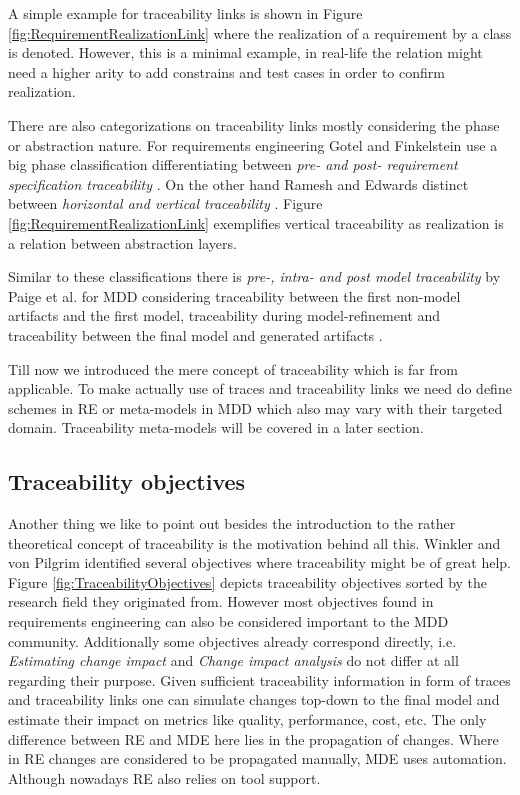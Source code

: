 

A simple example for traceability links is shown in Figure \ref{fig:RequirementRealizationLink} where the realization of a requirement by a class is denoted. 
However, this is a minimal example, in real-life the relation might need a higher arity to add constrains and test cases in order to confirm realization.

There are also categorizations on traceability links mostly considering the phase or abstraction nature.
For requirements engineering Gotel and Finkelstein use a big phase classification differentiating between \textit{pre- and post- requirement specification traceability} \cite{GotelFinkelstein}.
On the other hand Ramesh and Edwards distinct between \textit{horizontal and vertical traceability} \cite{RameshEdwards}.
Figure \ref{fig:RequirementRealizationLink} exemplifies vertical traceability as realization is a relation between abstraction layers.

Similar to these classifications there is \textit{pre-, intra- and post model traceability} by Paige et al. for MDD considering traceability between the first non-model artifacts and the first model, traceability during model-refinement and traceability between the final model and generated artifacts \cite{TraceabilitySurvey}.

Till now we introduced the mere concept of traceability which is far from applicable.
To make actually use of traces and traceability links we need do define schemes in RE or meta-models in MDD which also may vary with their targeted domain.
Traceability meta-models will be covered in a later section.


\subsection{Traceability objectives}
Another thing we like to point out besides the introduction to the rather theoretical concept of traceability is the motivation behind all this. 
Winkler and von Pilgrim \cite{TraceabilitySurvey} identified several objectives where traceability might be of great help. 
Figure \ref{fig:TraceabilityObjectives} depicts traceability objectives sorted by the research field they originated from. 
However most objectives found in requirements engineering can also be considered important to the MDD community. 
Additionally some objectives already correspond directly, i.e. \textit{Estimating change impact} and \textit{Change impact analysis} do not differ at all regarding their purpose. 
Given sufficient traceability information in form of traces and traceability links one can simulate changes top-down to the final model and estimate their impact on metrics like quality, performance, cost, etc. 
The only difference between RE and MDE here lies in the propagation of changes. 
Where in RE changes are considered to be propagated manually, MDE uses automation. 
Although nowadays RE also relies on tool support.

